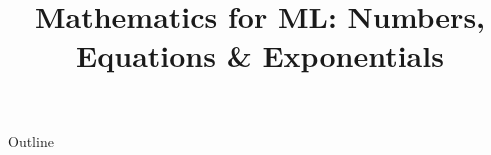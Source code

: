 \documentclass[xcolor=dvipsnames,compress,t,pdf,9pt]{beamer}
\title[\insertframenumber /\inserttotalframenumber]{Mathematics for ML: Numbers, Equations \& Exponentials}
\begin{document}
	\begin{frame}
	\titlepage
	\end{frame}

	\begin{frame}{Outline}
	    \tableofcontents
	\end{frame}

	
	
	
	
\end{document}
